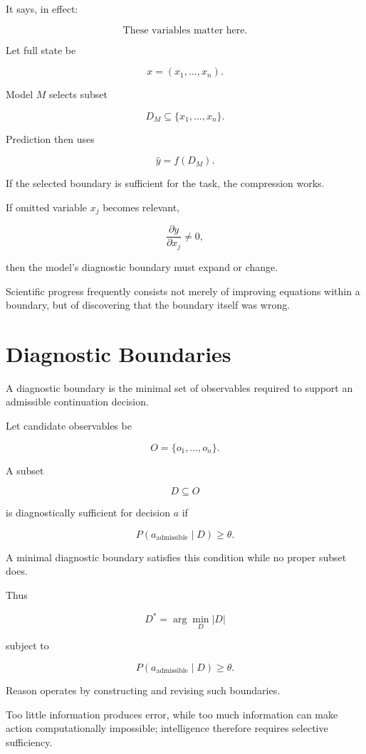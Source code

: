 \documentclass[11pt,oneside]{book}
\theoremstyle{definition}
\theoremstyle{remark}
\begin{document}
It says, in effect:

\[
\text{These variables matter here.}
\]

Let full state be

\[
x=(x_1,\ldots,x_n).
\]

Model \(M\) selects subset

\[
D_M
\subseteq
\{x_1,\ldots,x_n\}.
\]

Prediction then uses

\[
\hat{y}
=
f(D_M).
\]

If the selected boundary is sufficient for the task, the compression works.

If omitted variable \(x_j\) becomes relevant,

\[
\frac{\partial y}{\partial x_j}\neq0,
\]

then the model's diagnostic boundary must expand or change.

Scientific progress frequently consists not merely of improving equations within a boundary, but of discovering that the boundary itself was wrong.

\section{Diagnostic Boundaries}

A diagnostic boundary is the minimal set of observables required to support an admissible continuation decision.

Let candidate observables be

\[
O=\{o_1,\ldots,o_n\}.
\]

A subset

\[
D\subseteq O
\]

is diagnostically sufficient for decision \(a\) if

\[
P(a_{\mathrm{admissible}}\mid D)
\geq\theta.
\]

A minimal diagnostic boundary satisfies this condition while no proper subset does.

Thus

\[
D^\ast
=
\arg\min_D |D|
\]

subject to

\[
P(a_{\mathrm{admissible}}\mid D)
\geq\theta.
\]

Reason operates by constructing and revising such boundaries.

Too little information produces error, while too much information can make action computationally impossible; intelligence therefore requires selective sufficiency.
\end{document}
